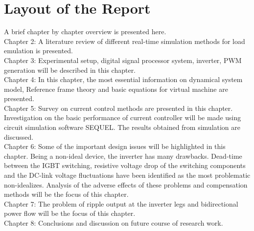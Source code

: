 \section{Layout of the Report} A brief chapter by chapter overview is presented here.\\
Chapter 2: A literature review of different real-time simulation methods for load emulation is presented.  \\
Chapter 3: Experimental setup, digital signal processor system, inverter, PWM generation will be described in this chapter.\\
Chapter 4: In this chapter, the most essential information on dynamical system model, Reference frame theory and basic equations for virtual machine are presented.  \\
Chapter 5: Survey on current control methods are presented in this chapter. Investigation on the basic performance of current controller will be made using circuit simulation software SEQUEL. The results obtained from simulation are discussed.\\
Chapter 6: Some of the important design issues will be highlighted in this chapter. Being a non-ideal device, the inverter has many drawbacks. Dead-time between the IGBT switching, resistive voltage drop of the switching components and the DC-link voltage fluctuations have been identified as the most problematic non-idealizes. Analysis of the adverse effects of these problems and compensation methods will be the focus of this chapter.\\
Chapter 7:  The problem of ripple output at the inverter legs and bidirectional power flow  will be the focus of this chapter.\\
Chapter 8: Conclusions and discussion on future course of research work.\\
